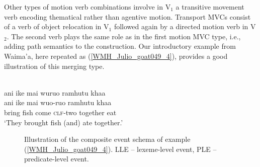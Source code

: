 Other types of motion verb combinations involve in V$_1$ a transitive movement verb encoding thematical rather than agentive motion. Transport MVCs consist of a verb of object relocation in V$_1$ followed again by a directed motion verb in V$_2$. The second verb plays the same role as in the first motion MVC type, i.e., adding path semantics to the construction. Our introductory example from Waima'a, here repeated as (\ref{WMH_Julio_goat049_4}), provides a good illustration of this merging type.

\ea \label{WMH_Julio_goat049_4}
\\
\glll ani ike mai wuruo ramhutu khaa \\
ani ike mai wuo-ruo ramhutu khaa \\
bring fish come \textsc{clf}-two together eat\\
\glft `They brought fish (and) ate together.' \\ 
\z

\begin{figure}
\caption[Event schema illustration of example (\ref{WMH_Julio_goat049_4})]{Illustration of the composite event schema of example (\ref{WMH_Julio_goat049_4}). LLE -- lexeme-level event, PLE -- predicate-level event.}
\label{figure:eventschema_WP2}
\end{figure}

